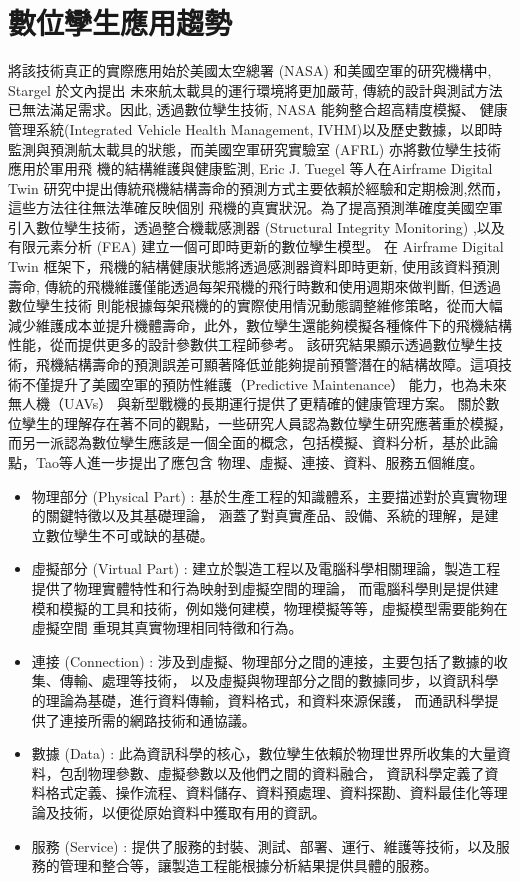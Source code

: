 \section{數位孿生應用趨勢}
將該技術真正的實際應用始於美國太空總署 (NASA) 和美國空軍的研究機構中, Stargel \cite{Glaessgen2012DigitalTwin}於文內提出
未來航太載具的運行環境將更加嚴苛, 傳統的設計與測試方法已無法滿足需求。因此, 透過數位孿生技術, NASA 能夠整合超高精度模擬、
健康管理系統(Integrated Vehicle Health Management, IVHM)以及歷史數據，以即時監測與預測航太載具的狀態，而美國空軍研究實驗室 (AFRL) 亦將數位孿生技術應用於軍用飛
機的結構維護與健康監測, Eric J. Tuegel \cite{Tuegel2011DigitalTwin}等人在Airframe Digital Twin 研究中提出傳統飛機結構壽命的預測方式主要依賴於經驗和定期檢測,然而，這些方法往往無法準確反映個別
飛機的真實狀況。為了提高預測準確度美國空軍引入數位孿生技術，透過整合機載感測器 (Structural Integrity Monitoring) ,以及有限元素分析 (FEA) 建立一個可即時更新的數位孿生模型。
在 Airframe Digital Twin 框架下，飛機的結構健康狀態將透過感測器資料即時更新, 使用該資料預測壽命, 傳統的飛機維護僅能透過每架飛機的飛行時數和使用週期來做判斷, 但透過數位孿生技術
則能根據每架飛機的的實際使用情況動態調整維修策略，從而大幅減少維護成本並提升機體壽命，此外，數位孿生還能夠模擬各種條件下的飛機結構性能，從而提供更多的設計參數供工程師參考。
該研究結果顯示透過數位孿生技術，飛機結構壽命的預測誤差可顯著降低並能夠提前預警潛在的結構故障。這項技術不僅提升了美國空軍的預防性維護（Predictive Maintenance） 能力，也為未來無人機（UAVs）
與新型戰機的長期運行提供了更精確的健康管理方案。
關於數位孿生的理解存在著不同的觀點，一些研究人員認為數位孿生研究應著重於模擬，而另一派認為數位孿生應該是一個全面的概念，包括模擬、資料分析，基於此論點，Tao等人\cite{Tao2019DigitalTwin}進一步提出了應包含
物理、虛擬、連接、資料、服務五個維度。
\begin{itemize}
    \item 物理部分 (Physical Part) :
          基於生產工程的知識體系，主要描述對於真實物理的關鍵特徵以及其基礎理論，
          涵蓋了對真實產品、設備、系統的理解，是建立數位孿生不可或缺的基礎。
    \item 虛擬部分 (Virtual Part) :
          建立於製造工程以及電腦科學相關理論，製造工程提供了物理實體特性和行為映射到虛擬空間的理論，
          而電腦科學則是提供建模和模擬的工具和技術，例如幾何建模，物理模擬等等，虛擬模型需要能夠在虛擬空間
          重現其真實物理相同特徵和行為。
    \item 連接 (Connection) :
          涉及到虛擬、物理部分之間的連接，主要包括了數據的收集、傳輸、處理等技術，
          以及虛擬與物理部分之間的數據同步，以資訊科學的理論為基礎，進行資料傳輸，資料格式，和資料來源保護，
          而通訊科學提供了連接所需的網路技術和通協議。
    \item 數據 (Data) :
          此為資訊科學的核心，數位孿生依賴於物理世界所收集的大量資料，包刮物理參數、虛擬參數以及他們之間的資料融合，
          資訊科學定義了資料格式定義、操作流程、資料儲存、資料預處理、資料探勘、資料最佳化等理論及技術，以便從原始資料中獲取有用的資訊。
    \item 服務 (Service) :
          提供了服務的封裝、測試、部署、運行、維護等技術，以及服務的管理和整合等，讓製造工程能根據分析結果提供具體的服務。
\end{itemize}
